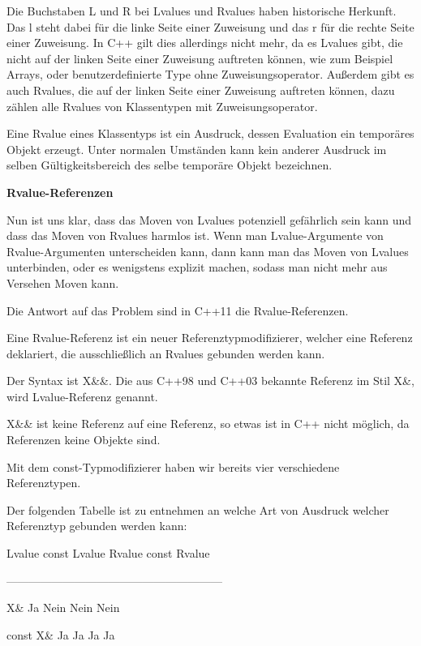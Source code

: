 \documentclass{article}
\begin{document}
\parindent=0pt
Die Buchstaben L und R bei Lvalues und Rvalues haben historische Herkunft. Das 
l steht dabei für die linke Seite einer Zuweisung und das r für die rechte Seite 
einer Zuweisung. In C++ gilt dies allerdings nicht mehr, da es Lvalues gibt, die 
nicht auf der linken Seite einer Zuweisung auftreten können, wie zum Beispiel 
Arrays, oder benutzerdefinierte Type ohne Zuweisungsoperator. Außerdem gibt es 
auch Rvalues, die auf der linken Seite einer Zuweisung auftreten können, dazu 
zählen alle Rvalues von Klassentypen mit Zuweisungsoperator.

Eine Rvalue eines Klassentyps ist ein Ausdruck, dessen Evaluation ein temporäres 
Objekt erzeugt. Unter normalen Umständen kann kein anderer Ausdruck im selben 
Gültigkeitsbereich des selbe temporäre Objekt bezeichnen.

\vspace{38pt}
\textbf{Rvalue-Referenzen}

Nun ist uns klar, dass das Moven von Lvalues potenziell gefährlich sein kann und 
dass das Moven von Rvalues harmlos ist. Wenn man Lvalue-Argumente von Rvalue-Argumenten 
unterscheiden kann, dann kann man das Moven von Lvalues unterbinden, oder es wenigstens 
explizit machen, sodass man nicht mehr aus Versehen Moven kann.

Die Antwort auf das Problem sind in C++11 die Rvalue-Referenzen.

Eine Rvalue-Referenz ist ein neuer Referenztypmodifizierer, welcher eine Referenz 
deklariert, die ausschließlich an Rvalues gebunden werden kann.

Der Syntax ist X\&\&. Die aus C++98 und C++03 bekannte Referenz im Stil X\&, wird 
Lvalue-Referenz genannt.

X\&\& ist keine Referenz auf eine Referenz, so etwas ist in C++ nicht möglich, 
da Referenzen keine Objekte sind.

Mit dem const-Typmodifizierer haben wir bereits vier verschiedene Referenztypen.

Der folgenden Tabelle ist zu entnehmen an welche Art von Ausdruck welcher Referenztyp 
gebunden werden kann:            

\parindent=43pt
Lvalue   const Lvalue   Rvalue   const Rvalue

\parindent=0pt
---------------------------------------------------------              

X\&          Ja     Nein           Nein     Nein

const X\&    Ja        Ja             Ja       Ja
\end{document}
